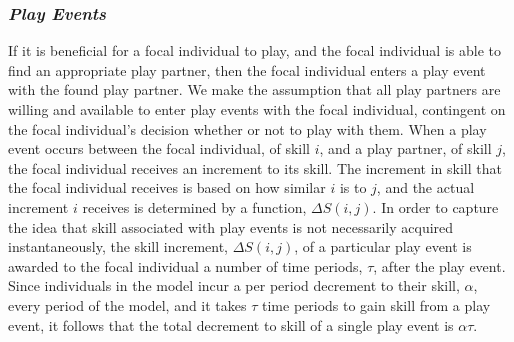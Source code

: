 \documentclass[12pt, letterpaper, fleqn]{article}
\begin{document}
  
    \subsubsection*{\it Play Events}
      \indent If it is beneficial for a focal individual to play, and the focal individual is able to find an appropriate play partner, then the focal individual enters a play event with the found play partner. %
      We make the assumption that all play partners are willing and available to enter play events with the focal individual, contingent on the focal individual's decision whether or not to play with them. %
      When a play event occurs between the focal individual, of skill $i$, and a play partner, of skill $j$, the focal individual receives an increment to its skill.
      The increment in skill that the focal individual receives is based on how similar $i$ is to $j$, and the actual increment $i$ receives is determined by a function, $\Delta S(i,j)$. %
      In order to capture the idea that skill associated with play events is not necessarily acquired instantaneously, the skill increment, $\Delta S(i,j)$, of a particular play event is awarded to the focal individual a number of time periods, $\tau$, after the play event.  
      Since individuals in the model incur a per period decrement to their skill, $\alpha$, every period of the model, and it takes $\tau$ time periods to gain skill from a play event, it follows that the total decrement to skill of a single play event is $\alpha \tau$. %
   
\end{document}
